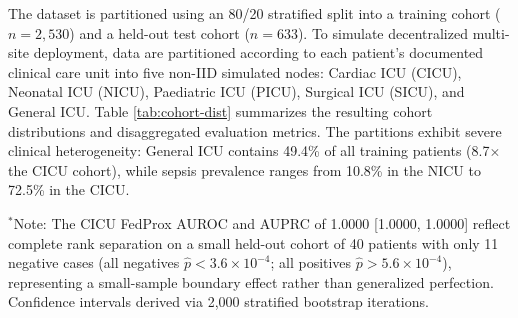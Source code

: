 \documentclass[runningheads]{llncs}
\begin{document}
The dataset is partitioned using an 80/20 stratified split into a training cohort ($n = 2{,}530$) and a held-out test cohort ($n = 633$). To simulate decentralized multi-site deployment, data are partitioned according to each patient's documented clinical care unit into five non-IID simulated nodes: Cardiac ICU (CICU), Neonatal ICU (NICU), Paediatric ICU (PICU), Surgical ICU (SICU), and General ICU. Table \ref{tab:cohort-dist} summarizes the resulting cohort distributions and disaggregated evaluation metrics. The partitions exhibit severe clinical heterogeneity: General ICU contains 49.4\% of all training patients (8.7$\times$ the CICU cohort), while sepsis prevalence ranges from 10.8\% in the NICU to 72.5\% in the CICU.

\begin{table}[t]
\caption{Care-unit cohort distributions and disaggregated federated test performance}
\label{tab:cohort-dist}
\centering
\small
{}
\vspace{1mm}
\raggedright \scriptsize $^*$Note: The CICU FedProx AUROC and AUPRC of 1.0000 [1.0000, 1.0000] reflect complete rank separation on a small held-out cohort of 40 patients with only 11 negative cases (all negatives $\hat{p} < 3.6\times 10^{-4}$; all positives $\hat{p} > 5.6\times 10^{-4}$), representing a small-sample boundary effect rather than generalized perfection. Confidence intervals derived via 2,000 stratified bootstrap iterations.
\end{table}
\end{document}
